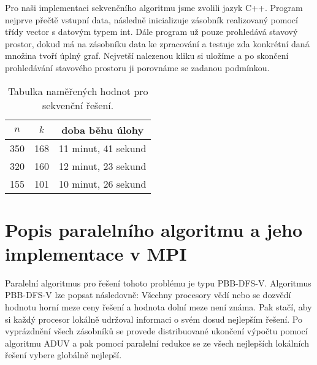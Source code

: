 \documentclass[12pt]{article}
\begin{document}
Pro naši implementaci sekvenčního algoritmu jsme zvolili jazyk C++.
Program nejprve přečtě vstupní data, následně inicializuje zásobník realizovaný pomocí třídy vector s datovým typem int.
Dále program už pouze prohledává stavový prostor, dokud má na zásobníku data ke zpracování
a testuje zda konkrétní daná množina tvoří úplný graf. 
Nejvetší nalezenou kliku si uložíme a po skončení prohledávání stavového prostoru ji porovnáme se zadanou podmínkou.



\begin{table}[ht]
  \begin{center}
    \begin{tabular}{| c | c | c |}
      \hline
      $n$ & $k$ & doba běhu úlohy \\ \hline
      350 & 168 & 11 minut, 41 sekund \\ \hline
      320 & 160 & 12 minut, 23 sekund \\ \hline
      155 & 101 & 10 minut, 26 sekund \\
      \hline
    \end{tabular}
    \caption{Tabulka naměřených hodnot pro sekvenční řešení.}
  \end{center}
\end{table}





\section{Popis paralelního algoritmu a jeho implementace v MPI}

Paralelní algoritmus pro řešení tohoto problému je typu PBB-DFS-V. 
Algoritmus PBB-DFS-V lze popsat následovně: 
Všechny procesory vědí nebo se dozvědí hodnotu horní meze ceny řešení a hodnota dolní meze není známa. 
Pak stačí, aby si každý procesor lokálně udržoval informaci o svém dosud nejlepším řešení. 
Po vyprázdnění všech zásobníků se provede distribuované ukončení výpočtu pomocí algoritmu ADUV a 
pak pomocí paralelní redukce se ze všech nejlepších lokálních řešení vybere globálně nejlepší. 
\end{document}
